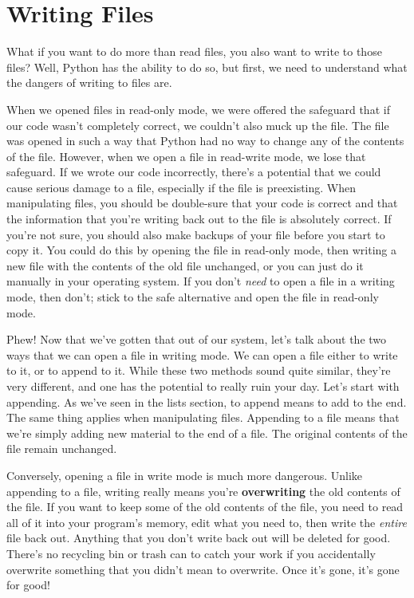 \section{Writing Files}
What if you want to do more than read files, you also want to write to those files? Well, Python has the ability to do so, but first, we need to understand what the dangers of writing to files are.\par
When we opened files in read-only mode, we were offered the safeguard that if our code wasn't completely correct, we couldn't also muck up the file. The file was opened in such a way that Python had no way to change any of the contents of the file. However, when we open a file in read-write mode, we lose that safeguard. If we wrote our code incorrectly, there's a potential that we could cause serious damage to a file, especially if the file is preexisting. When manipulating files, you should be double-sure that your code is correct and that the information that you're writing back out to the file is absolutely correct. If you're not sure, you should also make backups of your file before you start to copy it. You could do this by opening the file in read-only mode, then writing a new file with the contents of the old file unchanged, or you can just do it manually in your operating system. If you don't \textit{need} to open a file in a writing mode, then don't; stick to the safe alternative and open the file in read-only mode.\par
Phew! Now that we've gotten that out of our system, let's talk about the two ways that we can open a file in writing mode. We can open a file either to write to it, or to append to it. While these two methods sound quite similar, they're very different, and one has the potential to really ruin your day. Let's start with appending. As we've seen in the lists section, to append means to add to the end. The same thing applies when manipulating files. Appending to a file means that we're simply adding new material to the end of a file. The original contents of the file remain unchanged.\par
Conversely, opening a file in write mode is much more dangerous. Unlike appending to a file, writing really means you're \textbf{overwriting} the old contents of the file. If you want to keep some of the old contents of the file, you need to read all of it into your program's memory, edit what you need to, then write the \textit{entire} file back out. Anything that you don't write back out will be deleted for good. There's no recycling bin or trash can to catch your work if you accidentally overwrite something that you didn't mean to overwrite. Once it's gone, it's gone for good!\par
